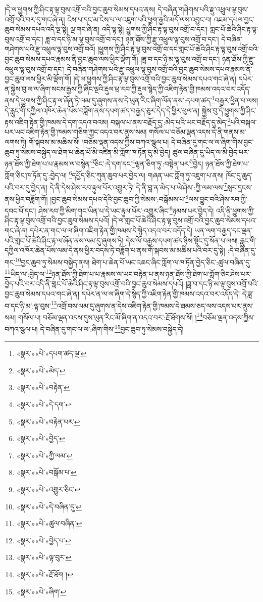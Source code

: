 །དེ་ལ་ཕྱུགས་ཀྱི་ཤིང་རྟ་ལྟ་བུས་འགྲོ་བའི་བྱང་ཆུབ་སེམས་དཔའ་ནས། དེ་བཞིན་གཤེགས་པའི་རྫུ་འཕྲུལ་ལྟ་བུས་འགྲོ་བའི་བར་དུ་གང་ཞེ་ན། ངེས་པ་དང་མ་ངེས་པ་ལ་འཇུག་པའི་ཕྱག་རྒྱའི་མདོ་ལས་འབྱུང་བ། འཇམ་དཔལ་བྱང་ཆུབ་སེམས་དཔའ་འདི་ལྔ་སྟེ། ལྔ་གང་ཞེ་ན། འདི་ལྟ་སྟེ། ཕྱུགས་ཀྱི་ཤིང་རྟ་ལྟ་བུས་འགྲོ་བ་དང་། གླང་པོ་ཆེའི་ཤིང་རྟ་ལྟ་བུས་འགྲོ་བ་དང་། ཟླ་བ་དང་ཉི་མ་ལྟ་བུས་འགྲོ་བ་དང་། ཉན་ཐོས་ཀྱི་རྫུ་འཕྲུལ་ལྟ་བུས་འགྲོ་བ་དང་། དེ་བཞིན་གཤེགས་པའི་རྫུ་འཕྲུལ་ལྟ་བུས་འགྲོ་བའོ། །ཕྱུགས་ཀྱི་ཤིང་རྟ་ལྟ་བུས་འགྲོ་བ་དང་གླང་པོ་ཆེའི་ཤིང་རྟ་ལྟ་བུས་འགྲོ་བའི་བྱང་ཆུབ་སེམས་དཔའ་རྣམས་ནི་བྱང་ཆུབ་ལས་ཕྱིར་ལྡོག་གོ། །ཟླ་བ་དང་ཉི་མ་ལྟ་བུས་འགྲོ་བ་དང་། ཉན་ཐོས་ཀྱི་རྫུ་འཕྲུལ་ལྟ་བུས་འགྲོ་བ་དང་། དེ་བཞིན་གཤེགས་པའི་རྫུ་འཕྲུལ་ལྟ་བུས་འགྲོ་བའི་བྱང་ཆུབ་སེམས་དཔའ་རྣམས་ནི་བྱང་ཆུབ་ལས་ཕྱིར་མི་ལྡོག་གོ། །དེ་ལ་ཕྱུགས་ཀྱི་ཤིང་རྟ་ལྟ་བུས་འགྲོ་བའི་བྱང་ཆུབ་སེམས་དཔའ་གང་ཞེ་ན། དཔེར་ན་སྐྱེས་བུ་ལ་ལ་ཞིག་སངས་རྒྱས་ཀྱི་ཞིང་ལྔའི་རྡུལ་ཕྲ་རབ་ཀྱི་རྡུལ་སྙེད་ཀྱི་འཇིག་རྟེན་གྱི་ཁམས་འདའ་བར་འདོད་ནས་དེ་ཕྱུགས་ཀྱི་ཤིང་རྟ་ལ་ཞོན་ཏེ་ལམ་དུ་ཞུགས་ནས་དེ་ཡུན་རིང་ཞིག་ལོན་ནས་:དཔག་ཚད་\footnote{«སྣར་»«པེ་»དཔག་ཚད་ལྔ་}བརྒྱར་ཕྱིན་པ་ལས། དེ་རླུང་གི་དཀྱིལ་འཁོར་ཆེན་པོས་བཟློག་ནས་དཔག་ཚད་བརྒྱད་ཅུར་དེད་དེ་ཕྱིར་ཕུལ་ན། སྐྱེས་བུ་དེ་ཕྱུགས་ཀྱི་ཤིང་རྟས་འཇིག་རྟེན་གྱི་ཁམས་དེ་དག་འདའ་བའམ། བསྐལ་པ་ནས་བརྗོད་དུ་:མེད་པའི་ཡང་བརྗོད་དུ་མེད་\footnote{«སྣར་»«པེ་»མེད་}པའི་བསྐལ་པར་ཡང་འཇིག་རྟེན་གྱི་ཁམས་གཅིག་ཀྱང་འདའ་བར་ནུས་སམ། གསོལ་པ་བཅོམ་ལྡན་འདས་དེ་ནི་གནས་མ་ལགས་ཏེ། གོ་སྐབས་མ་མཆིས་སོ། །བཅོམ་ལྡན་འདས་ཀྱིས་བཀའ་སྩལ་པ། དེ་བཞིན་དུ་གང་ལ་ལ་ཞིག་གིས་བྱང་ཆུབ་ཏུ་སེམས་བསྐྱེད་ལ་ཐེག་པ་ཆེན་པོ་མི་འཛིན་མི་ཀློག་ཁ་ཏོན་དུ་མི་བྱེད། ཚུལ་བཞིན་དུ་ཡིད་ལ་མི་བྱེད་པར་ཉན་ཐོས་ཀྱི་ཐེག་པ་པ་རྣམས་ལ་བསྙེན་\footnote{«སྣར་»«པེ་»བརྟེན་}ཅིང་:དེ་དག་དང་\footnote{«སྣར་»«པེ་»དེ་དག་}ལྷན་ཅིག་ཏུ་:བསྟེན་པར་\footnote{«སྣར་»«པེ་»བརྟེན་པར་}བྱེད། ཉན་ཐོས་ཀྱི་ཐེག་པ་ཀློག་ཅིང་ཁ་ཏོན་དུ་:བྱེད་ལ། \footnote{«སྣར་»«པེ་»བྱེད་}དཔྱོད་ཅིང་ཀུན་ཆུབ་པར་བྱེད་ལ། གཞན་ཡང་ཀློག་ཏུ་འཇུག་པ་ནས། ཁོང་དུ་ཆུད་པའི་བར་དུ་བྱེད་ན། དེ་ནི་དེས་ཤེས་རབ་རྟུལ་པོར་འགྱུར་ཏེ། དེ་ནི་བླ་ན་མེད་པ་ཡེ་ཤེས་:ཀྱི་ལམ་ལས་\footnote{«སྣར་»«པེ་»ཀྱི་ལམ་}སླར་དྲངས་ནས་ཕྱིར་བཟློག་གོ། །བྱང་ཆུབ་སེམས་དཔའ་དེའི་བྱང་ཆུབ་ཀྱི་སེམས་:བསྒོམས་པ་\footnote{«སྣར་»«པེ་»བསྒོམ་པ་}ལས་བྱུང་བའི་ཤེས་རབ་ཀྱི་དབང་པོ་དང་། ཤེས་རབ་ཀྱི་མིག་གང་ཡིན་པ་དེ་ཡང་རྟུལ་པོར་:འགྱུར་ཞིང་\footnote{«སྣར་»«པེ་»འགྱུར་ཅིང་}ཉམས་པར་བྱེད་དེ། འདི་ནི་ཕྱུགས་ཀྱི་ཤིང་རྟ་ལྟ་བུས་འགྲོ་བའི་བྱང་ཆུབ་སེམས་དཔའོ། །དེ་ལ་གླང་པོ་ཆེའི་ཤིང་རྟ་ལྟ་བུས་འགྲོ་བའི་བྱང་ཆུབ་སེམས་དཔའ་གང་ཞེ་ན། དཔེར་ན་གང་ལ་ལ་ཞིག་འཇིག་རྟེན་གྱི་ཁམས་དེ་སྙེད་འདའ་བར་འདོད་དེ། ཡན་ལག་བརྒྱད་དང་ལྡན་པའི་གླང་པོ་ཆེའི་ཤིང་རྟ་ལ་ཞོན་ནས་ལམ་དུ་ཞུགས་ཏེ། དེས་ལོ་བརྒྱས་དཔག་ཚད་ཉིས་སྟོང་དུ་སོན་པ་ལས། རླུང་གི་དཀྱིལ་འཁོར་ཆེན་པོས་ལམ་དེ་ནས་ཕྱིར་བདས་ཏེ་བཟློག་པ་ནས་གོ་སྐབས་མ་མཆིས་པའི་བར་དུ་སྟེ། :དེ་བཞིན་དུ་གང་\footnote{«སྣར་»«པེ་»དེ་བཞིན་དུ་}བྱང་ཆུབ་ཏུ་སེམས་བསྐྱེད་ནས། ཐེག་པ་ཆེན་པོ་ཡང་འཆང་ཞིང་ཀློག་ལ་ཁ་ཏོན་བྱེད་ཅིང་:ཚུལ་བཞིན་དུ་\footnote{«སྣར་»«པེ་»ཚུལ་བཞིན་}ཡིད་ལ་:བྱེད་ལ་\footnote{«སྣར་»«པེ་»བྱེད་པ་}ཉན་ཐོས་ཀྱི་ཐེག་པ་པ་རྣམས་ལ་ཡང་བརྟེན་པ་ནས་ཉན་ཐོས་ཀྱི་ཐེག་པ་ཀློག་ཅིང་ཤེས་པར་བྱེད་པའི་བར་འདི་ནི་གླང་པོ་ཆེའི་ཤིང་རྟ་ལྟ་བུས་འགྲོ་བའི་བྱང་ཆུབ་སེམས་དཔའོ། །ཟླ་བ་དང་ཉི་མ་ལྟ་བུས་འགྲོ་བའི་བྱང་ཆུབ་སེམས་དཔའ་གང་ཞེ་ན། དཔེར་ན་ལ་ལ་ཞིག་དེ་སྙེད་ཀྱི་འཇིག་རྟེན་གྱི་ཁམས་འདའ་བར་འདོད་དེ། དེ་ཟླ་བ་དང་ཉི་མ་:ལྟ་བུས་\footnote{«སྣར་»«པེ་»ལྟ་བུར་}འགྲོ་བས་ལམ་དུ་ཞུགས་ན་དེས་འཇིག་རྟེན་གྱི་ཁམས་དེ་ཐམས་ཅད་ལས་འདས་པར་ནུས་སམ། གསོལ་པ། བཅོམ་ལྡན་འདས་དུས་ཡུན་རིང་མོ་ཞིག་ན་འདའ་བར་:རྔོ་ཐོགས་སོ། །\footnote{«སྣར་»«པེ་»རྔོ་ཐོག །}བཅོམ་ལྡན་འདས་ཀྱིས་བཀའ་སྩལ་པ། དེ་བཞིན་དུ་གང་ལ་ལ་:ཞིག་གིས་\footnote{«སྣར་»«པེ་»ཞིག་}བྱང་ཆུབ་ཏུ་སེམས་བསྐྱེད་དེ། 